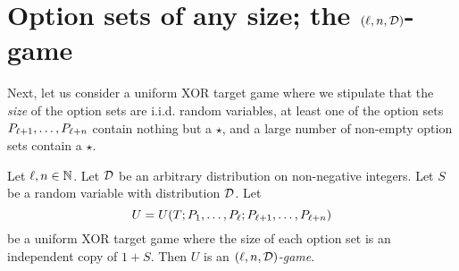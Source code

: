 









\section{Option sets of any size\texorpdfstring{; the $(\ell, n, \mathcal{D})$-game}{}}
    Next, let us consider a uniform XOR target game where we stipulate that 
    the \emph{size} of the option sets are i.i.d. random variables, 
    at least one of the option sets $P_{\ell+1}, \ldots, P_{\ell+n}$ contain nothing but a $\star$, 
    and a large number of non-empty option sets contain a $\star$. 

    \begin{definition}
        \label{def:adaptive-game}
        Let $\ell, n\in \mathbb{N}$. 
        Let $\mathcal{D}$ be an arbitrary distribution on non-negative integers. 
        Let $S$ be a random variable with distribution $\mathcal{D}$.
        Let $$U = U(T; P_1, \ldots, P_\ell; P_{\ell+1}, \ldots, P_{\ell+n} )$$ be a uniform XOR target game where 
        the size of each option set is an independent copy of $1 + S$. 
        Then $U$ is an \emph{$(\ell, n, \mathcal{D})$-game}.
    \end{definition}

